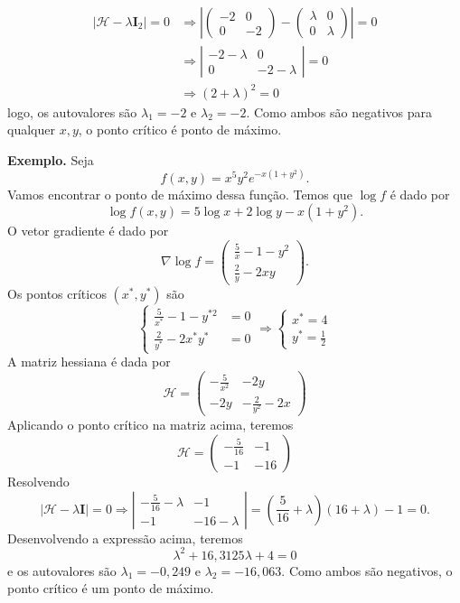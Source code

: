 \documentclass[
  letterpaper,
  DIV=11,
  numbers=noendperiod]{scrartcl}
\begin{document}
\[\begin{align}|\mathcal{H}-\lambda \textbf{I}_2|=0&\Rightarrow \left|\left(\begin{array}{cc} -2&0\\0&-2\end{array}\right)-\left(\begin{array}{cc}\lambda & 0 \\ 0 & \lambda\end{array}\right)\right|=0 \\
&\Rightarrow\left|\begin{array}{cc} -2-\lambda& 0\\0&-2-\lambda\end{array}\right|=0\\
&\Rightarrow (2+\lambda)^2=0\end{align}\] logo, os autovalores são
\(\lambda_1=-2\) e \(\lambda_2=-2\). Como ambos são negativos para
qualquer \(x,y\), o ponto crítico é ponto de máximo.

\textbf{Exemplo.} Seja \[f(x,y)=x^5y^2e^{-x(1+y^2)}.\] Vamos encontrar o
ponto de máximo dessa função. Temos que \(\log f\) é dado por
\[\log f(x,y)=5\log x+2\log y-x(1+y^2).\] O vetor gradiente é dado por
\[\nabla \log f=\left(\begin{array}{c}\frac{5}{x}-1-y^2 \\ \frac{2}{y}-2xy\end{array}\right).\]
Os pontos críticos \((x^*,y^*)\) são
\[\left\{\begin{array}{c}\frac{5}{x^*}-1-y^{*2}&=0 \\ \frac{2}{y^*}-2x^*y^*&=0\end{array}\right.\Rightarrow \left\{\begin{array}{c}x^*=4 \\ y^*=\frac{1}{2}\end{array}\right.\]
A matriz hessiana é dada por
\[\mathcal{H}=\left(\begin{array}{cc}-\frac{5}{x^2} & -2y \\ -2y & -\frac{2}{y^2}-2x\end{array}\right)\]
Aplicando o ponto crítico na matriz acima, teremos
\[\mathcal{H}=\left(\begin{array}{cc}-\frac{5}{16} & -1 \\ -1 & -16\end{array}\right)\]
Resolvendo
\[|\mathcal{H}-\lambda\textbf{I}|=0\Rightarrow \left|\begin{array}{cc}-\frac{5}{16}-\lambda & -1\\ -1 & -16-\lambda\end{array}\right|=\left(\frac{5}{16}+\lambda\right)(16+\lambda)-1=0.\]
Desenvolvendo a expressão acima, teremos
\[\lambda^2 +16,3125\lambda +4=0\] e os autovalores são
\(\lambda_1=-0,249\) e \(\lambda_2=-16,063\). Como ambos são negativos,
o ponto crítico é um ponto de máximo.
\end{document}
